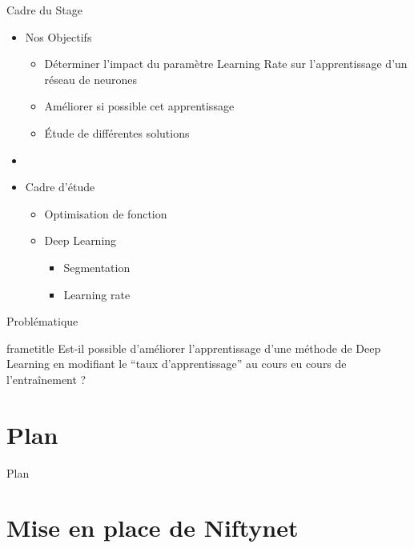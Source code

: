 \documentclass{beamer}
\begin{document}
\begin{frame}{Cadre du Stage}
  \begin{itemize}
    \item Nos Objectifs
    \begin{itemize}
      \item Déterminer l'impact du paramètre Learning Rate sur l'apprentissage d'un réseau de neurones
      \item Améliorer si possible cet apprentissage
      \item \'Etude de différentes solutions
    \end{itemize}
    \item[]
    \item Cadre d'étude
    \begin{itemize}
      \item Optimisation de fonction
      \item Deep Learning
      \begin{itemize}
        \item Segmentation
        \item Learning rate
      \end{itemize}
    \end{itemize}
  \end{itemize}
\end{frame}

\begin{frame}{Problématique}
  \begin{beamercolorbox}[ht=8ex,dp=1.5ex,center]{frametitle}
    Est-il possible d'améliorer l'apprentissage d'une méthode de Deep Learning en modifiant le ``taux d'apprentissage'' au cours eu cours de l'entraînement ?
  \end{beamercolorbox}
\end{frame}

\section*{Plan}
\begin{frame}{Plan}
  \tableofcontents
\end{frame}

\section{Mise en place de Niftynet}
\subsection*{}
\end{document}
